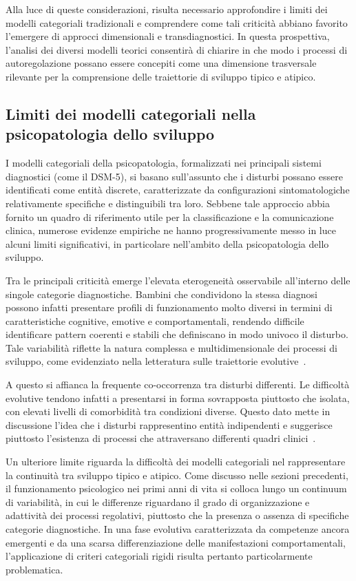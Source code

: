         Alla luce di queste considerazioni, risulta necessario approfondire i limiti dei modelli categoriali tradizionali e comprendere come tali criticità abbiano favorito l'emergere di approcci dimensionali e transdiagnostici. In questa prospettiva, l'analisi dei diversi modelli teorici consentirà di chiarire in che modo i processi di autoregolazione possano essere concepiti come una dimensione trasversale rilevante per la comprensione delle traiettorie di sviluppo tipico e atipico.

        \subsection{Limiti dei modelli categoriali nella psicopatologia dello sviluppo}
        \label{sec:2_4_1}

            I modelli categoriali della psicopatologia, formalizzati nei principali sistemi diagnostici (come il DSM-5), si basano sull'assunto che i disturbi possano essere identificati come entità discrete, caratterizzate da configurazioni sintomatologiche relativamente specifiche e distinguibili tra loro. Sebbene tale approccio abbia fornito un quadro di riferimento utile per la classificazione e la comunicazione clinica, numerose evidenze empiriche ne hanno progressivamente messo in luce alcuni limiti significativi, in particolare nell'ambito della psicopatologia dello sviluppo.

            Tra le principali criticità emerge l'elevata eterogeneità osservabile all'interno delle singole categorie diagnostiche. Bambini che condividono la stessa diagnosi possono infatti presentare profili di funzionamento molto diversi in termini di caratteristiche cognitive, emotive e comportamentali, rendendo difficile identificare pattern coerenti e stabili che definiscano in modo univoco il disturbo. Tale variabilità riflette la natura complessa e multidimensionale dei processi di sviluppo, come evidenziato nella letteratura sulle traiettorie evolutive~\cite{rutter1989}.

            A questo si affianca la frequente co-occorrenza tra disturbi differenti. Le difficoltà evolutive tendono infatti a presentarsi in forma sovrapposta piuttosto che isolata, con elevati livelli di comorbidità tra condizioni diverse. Questo dato mette in discussione l'idea che i disturbi rappresentino entità indipendenti e suggerisce piuttosto l'esistenza di processi che attraversano differenti quadri clinici~\cite{astle2022}.

            Un ulteriore limite riguarda la difficoltà dei modelli categoriali nel rappresentare la continuità tra sviluppo tipico e atipico. Come discusso nelle sezioni precedenti, il funzionamento psicologico nei primi anni di vita si colloca lungo un continuum di variabilità, in cui le differenze riguardano il grado di organizzazione e adattività dei processi regolativi, piuttosto che la presenza o assenza di specifiche categorie diagnostiche. In una fase evolutiva caratterizzata da competenze ancora emergenti e da una scarsa differenziazione delle manifestazioni comportamentali, l'applicazione di criteri categoriali rigidi risulta pertanto particolarmente problematica.

